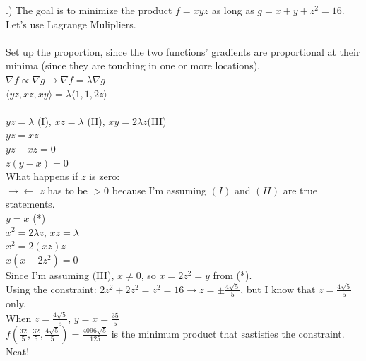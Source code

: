 \documentclass[12pt]{article}
\begin{document}
.) The goal is to minimize the product $f = xyz$ as long as $g = x + y + z^{2} = 16$. Let's use Lagrange Mulipliers.\\\\
\noindent Set up the proportion, since the two functions' gradients are proportional at their minima (since they are touching in one or more locations).
\noindent $\nabla f \propto \nabla g \rightarrow \nabla f = \lambda \nabla g$\\
\noindent $ \langle yz, xz, xy\rangle = \lambda \langle 1, 1, 2z\rangle$\\\\
\noindent $yz = \lambda$ (I), \hspace{10pt} $xz = \lambda$ (II), \hspace{10pt} $xy = 2\lambda z$(III)\\
\noindent $yz = xz$\\
\noindent $yz - xz = 0$\\
\noindent $z(y -x) = 0$\\
\noindent What happens if $z$ is zero: \\
\noindent $\rightarrow \leftarrow$ $z$ has to be $> 0$ because I'm assuming $(I)$ and $(II)$ are true statements.\\
\noindent $y = x$ (*)\\
\noindent $x^{2} = 2\lambda z$, \hspace{10pt} $xz = \lambda$\\
\noindent $x^{2} = 2(xz)z$\\
\noindent $x(x - 2z^{2}) = 0$\\
\noindent Since I'm assuming (III), $x \neq 0$, so $x = 2z^{2} = y$ from (*).\\
\noindent Using the constraint: $2z^{2} + 2z^{2} = z^{2} = 16 \rightarrow z = \pm \frac{4\sqrt{5}}{5}$, but I know that $z = \frac{4\sqrt{5}}{5}$ only. \\
\noindent When $z = \frac{4\sqrt{5}}{5}$, $y = x = \frac{35}{5}$\\
\noindent $f(\frac{32}{5}, \frac{32}{5}, \frac{4\sqrt{5}}{5}) = \frac{4096\sqrt{5}}{125}$ is the minimum product that sastisfies the constraint. Neat! \bcsmbh
\end{document}
